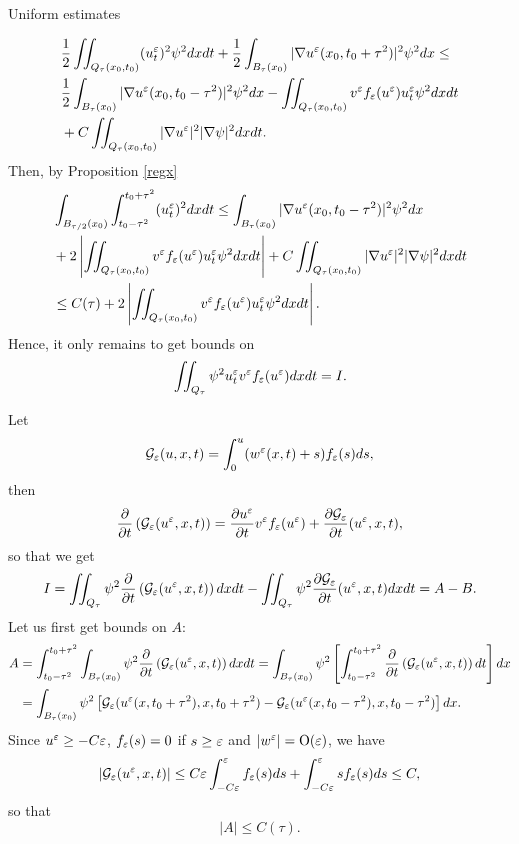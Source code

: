 \begin{section}{Uniform estimates}
\begin{pf}
\begin{align*}
&\frac12 \iint_{Q_{\tau}(x_0,t_0)}(u^{\varepsilon}_{t})^2\psi^2 dxdt +
\frac12 \int_{B_{\tau}(x_0)} |\nabla u^{\varepsilon}(x_0,t_0+\tau^2)|^2 \psi^2 dx \le\\
&\frac12 \int_{B_{\tau}(x_0)} |\nabla u^{\varepsilon}(x_0,t_0-\tau^2)|^2 \psi^2 dx 
- \iint_{Q_{\tau}(x_0,t_0)} v^{\varepsilon}f_{\varepsilon}(u^{\varepsilon})u^{\varepsilon}_t \psi^2 dxdt\\ 
&+C\iint_{Q_{\tau}(x_0,t_0)}|\nabla u^{\varepsilon}|^2|\nabla \psi|^2 dxdt.
\end{align*}
Then, by Proposition \ref{regx}
\begin{align*}
&\int_{B_{\tau/2}(x_0)}\int_{t_0-\tau^2}^{t_0+\tau^2}(u^{\varepsilon}_{t})^2 dxdt\le
\int_{B_{\tau}(x_0)} |\nabla u^{\varepsilon}(x_0,t_0-\tau^2)|^2 \psi^2 dx \\
&+2\left|\iint_{Q_{\tau}(x_0,t_0)} v^{\varepsilon}f_{\varepsilon}(u^{\varepsilon})u^{\varepsilon}_t \psi^2 
dxdt\right|
+ C\iint_{Q_{\tau}(x_0,t_0)}|\nabla u^{\varepsilon}|^2|\nabla \psi|^2 dxdt\\
&\le C(\tau) +2 \left|\iint_{Q_{\tau}(x_0,t_0)} v^{\varepsilon}f_{\varepsilon}(u^{\varepsilon})
u^{\varepsilon}_t \psi^2 dxdt\right|.
\end{align*}
Hence, it only remains to get bounds on
$$\iint_{Q_{\tau}}\psi^{2} u^{\varepsilon}_{t} v^{\varepsilon}f_{\varepsilon}(u^{\varepsilon}) dx dt = I.$$

Let 
$${\cal G}_{\varepsilon}(u,x,t) = \int_{0}^{u}(w^{\varepsilon}(x,t)+s)f_{\varepsilon}(s) ds,$$
then
$$\frac{\partial}{\partial t}\left({\cal G}_{\varepsilon}(u^{\varepsilon},x,t)\right)=
\frac{\partial u^{\varepsilon}}{\partial t} v^{\varepsilon}f_{\varepsilon}(u^{\varepsilon}) +
\frac{\partial {\cal G}_{\varepsilon}}{\partial t}(u^{\varepsilon},x,t),$$
so that we get
$$I=\iint_{Q_{\tau}}\psi^{2}\frac{\partial}{\partial t}\left(
{\cal G}_{\varepsilon}(u^{\varepsilon},x,t)\right) dx dt
- \iint_{Q_{\tau}}\psi^{2}\frac{\partial {\cal G}_{\varepsilon}}
{\partial t}(u^{\varepsilon},x,t) dx dt = A - B.$$
Let us first get bounds on $A$:
\begin{align*}
A&=\int_{t_{0}-\tau^{2}}^{t_{0}+\tau^{2}}\int_{B_{\tau}(x_{0})}
\psi^{2}\frac{\partial}{\partial t}\left({\cal G}_{\varepsilon}(u^{\varepsilon},x,t)\right) dx dt =
\int_{B_{\tau}(x_{0})}\psi^{2}\left[\int_{t_{0}-\tau^{2}}^{t_{0}+\tau^{2}}
\frac{\partial}{\partial t}\left({\cal G}_{\varepsilon}(u^{\varepsilon},x,t)\right) dt \right] dx\\
&=\int_{B_{\tau}(x_{0})}\psi^{2}\left[ 
{\cal G}_{\varepsilon}(u^{\varepsilon}(x,t_0+\tau^2),x,t_{0}+\tau^{2})-
{\cal G}_{\varepsilon}(u^{\varepsilon}(x,t_0-\tau^2),x,t_{0}-\tau^{2})\right] dx.
\end{align*}
Since $u^{\varepsilon}\ge -C\varepsilon$, $f_{\varepsilon}(s)=0$ if $s\ge\varepsilon$ and 
$|w^{\varepsilon}|=\mbox{O}(\varepsilon)$, we have 
$$|{\cal G}_{\varepsilon}(u^{\varepsilon},x,t)|\leq C\varepsilon\int_{-C\varepsilon}^{\varepsilon}
f_{\varepsilon}(s) ds+\int_{-C\varepsilon}^{\varepsilon}sf_{\varepsilon}(s)ds\le C,$$ 
so that
$$|A|\leq C(\tau).$$


\end{pf}
\end{section}
